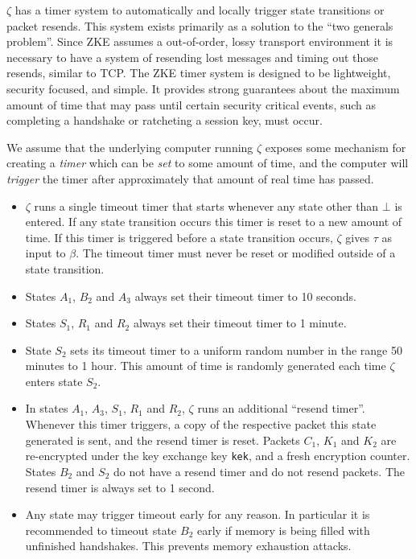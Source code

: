 \documentclass{article}
\begin{document}
\begin{definition}
	$\zeta$ has a timer system to automatically and locally trigger state transitions or packet resends. This system exists primarily as a solution to the ``two generals problem''. Since ZKE assumes a out-of-order, lossy transport environment it is necessary to have a system of resending lost messages and timing out those resends, similar to TCP. The ZKE timer system is designed to be lightweight, security focused, and simple. It provides strong guarantees about the maximum amount of time that may pass until certain security critical events, such as completing a handshake or ratcheting a session key, must occur.

	We assume that the underlying computer running $\zeta$ exposes some mechanism for creating a \emph{timer} which can be \emph{set} to some amount of time, and the computer will \emph{trigger} the timer after approximately that amount of real time has passed.
	\begin{itemize}
		\item $\zeta$ runs a single timeout timer that starts whenever any state other than $\bot$ is entered. If any state transition occurs this timer is reset to a new amount of time. If this timer is triggered before a state transition occurs, $\zeta$ gives $\tau$ as input to $\beta$. The timeout timer must never be reset or modified outside of a state transition.
		\item States $A_1$, $B_2$ and $A_3$ always set their timeout timer to 10 seconds.
		\item States $S_1$, $R_1$ and $R_2$ always set their timeout timer to 1 minute.
		\item State $S_2$ sets its timeout timer to a uniform random number in the range 50 minutes to 1 hour. This amount of time is randomly generated each time $\zeta$ enters state $S_2$.
		\item In states $A_1$, $A_3$, $S_1$, $R_1$ and $R_2$, $\zeta$ runs an additional ``resend timer''. Whenever this timer triggers, a copy of the respective packet this state generated is sent, and the resend timer is reset. Packets $C_1$, $K_1$ and $K_2$ are re-encrypted under the key exchange key \texttt{kek}, and a fresh encryption counter. States $B_2$ and $S_2$ do not have a resend timer and do not resend packets. The resend timer is always set to 1 second.
		\item Any state may trigger timeout early for any reason. In particular it is recommended to timeout state $B_2$ early if memory is being filled with unfinished handshakes. This prevents memory exhaustion attacks.

\end{itemize}
\end{definition}
\end{document}
